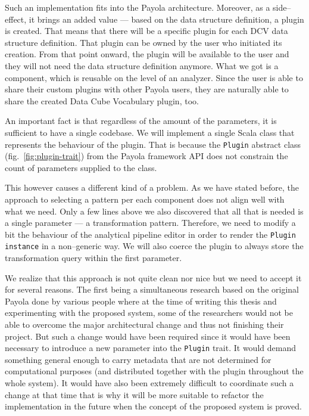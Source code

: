 Such an implementation fits into the Payola architecture. Moreover, as a side--effect, it brings
an added value --- based on the data structure definition, a plugin is created. 
That means that there will be a specific plugin for each DCV data structure 
definition. That plugin can be owned by the user who initiated its creation. 
From that point onward, the plugin will be available to the user and they
will not need the data structure definition anymore. What we got is a 
component, which is reusable on the level of an analyzer. Since the user is able to 
share their custom plugins with other Payola users, they are
naturally able to share the created Data Cube Vocabulary plugin, too. 

An important fact is that regardless of the amount of the parameters, it is sufficient 
to have a single codebase. We will implement a single Scala class that represents the behaviour 
of the plugin. That is because the \texttt{Plugin} abstract class (fig.~\ref{fig:plugin-trait})
from the Payola framework
API does not constrain the count of parameters supplied to the class.

This however causes a different kind of a problem. As we have stated before, the 
approach to selecting a pattern per each component does not align well with what we 
need. Only a few lines above we also discovered that all that is needed is a 
single parameter --- a transformation pattern. Therefore, we need to modify a bit the 
behaviour of the analytical pipeline editor in order to render the \texttt{Plugin instance}
in a non--generic way. We will also coerce the plugin to always store the transformation query 
within the first parameter.

We realize that this approach is not quite clean nor nice but we need to accept it for several reasons.
The first being a simultaneous research based on the original Payola done by various people where
at the time of writing this thesis and experimenting with the proposed system, some of the researchers 
would not be able to overcome the major architectural change and thus not finishing their project.
But such a change would have been required since 
it would have been necessary to introduce a new parameter into the \texttt{Plugin} trait. 
It would demand something general enough to carry metadata that are not determined for 
computational purposes (and distributed together with the plugin throughout the whole system).
It would have also been extremely difficult to coordinate such 
a change at that time that is why it will be more suitable to refactor the 
implementation in the future when the concept of the proposed system is 
proved.

